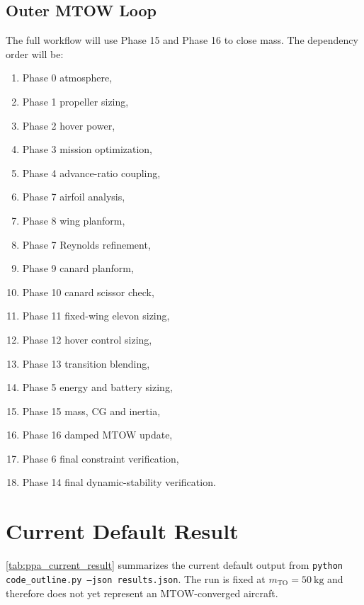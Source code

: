 \subsection{Outer MTOW Loop}

The full workflow will use Phase 15 and Phase 16 to close mass. The dependency order will be:
\begin{enumerate}[leftmargin=*]
    \item Phase 0 atmosphere,
    \item Phase 1 propeller sizing,
    \item Phase 2 hover power,
    \item Phase 3 mission optimization,
    \item Phase 4 advance-ratio coupling,
    \item Phase 7 airfoil analysis,
    \item Phase 8 wing planform,
    \item Phase 7 Reynolds refinement,
    \item Phase 9 canard planform,
    \item Phase 10 canard scissor check,
    \item Phase 11 fixed-wing elevon sizing,
    \item Phase 12 hover control sizing,
    \item Phase 13 transition blending,
    \item Phase 5 energy and battery sizing,
    \item Phase 15 mass, CG and inertia,
    \item Phase 16 damped MTOW update,
    \item Phase 6 final constraint verification,
    \item Phase 14 final dynamic-stability verification.
\end{enumerate}

\section{Current Default Result}
\label{sec:ppa_current_result}

\autoref{tab:ppa_current_result} summarizes the current default output from \texttt{python code\_outline.py --json results.json}. The run is fixed at \(m_{\mathrm{TO}}=50~\mathrm{kg}\) and therefore does not yet represent an MTOW-converged aircraft.

